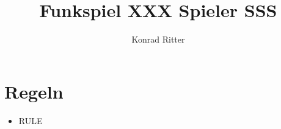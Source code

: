 \documentclass[12pt,a4paper]{scrreport}
\author{Konrad Ritter}
\title{Funkspiel XXX Spieler SSS}
\begin{document}
\maketitle
\section{Regeln}
\begin{itemize}
	\item RULE
\end{itemize}
\end{document}
